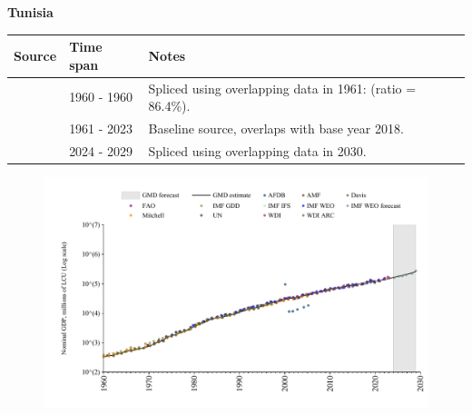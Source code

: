 \documentclass[12pt,a4paper,landscape]{article}
\begin{document}
\begin{adjustbox}{max totalsize={\paperwidth}{\paperheight},center}
\begin{minipage}[t][\textheight][t]{\textwidth}
\vspace*{0.5cm}
{}
\begin{center}
{\Large\bfseries Tunisia}
\end{center}
\vspace{0.5cm}
\begin{table}[H]
\centering
\small
\begin{tabular}{|l|l|l|}
\hline
\textbf{Source} & \textbf{Time span} & \textbf{Notes} \\
\hline
\rowcolor{white}\cite{IMF_GDD}& 1960 - 1960 &Spliced using overlapping data in 1961: (ratio = 86.4\%).\\
\rowcolor{lightgray}\cite{WDI}& 1961 - 2023 &Baseline source, overlaps with base year 2018.\\
\rowcolor{white}\cite{IMF_WEO_forecast}& 2024 - 2029 &Spliced using overlapping data in 2030.\\
\hline
\end{tabular}
\end{table}
\begin{figure}[H]
\centering
\includegraphics[width=\textwidth,height=0.6\textheight,keepaspectratio]{graphs/TUN_nGDP.pdf}
\end{figure}
\end{minipage}
\end{adjustbox}
\end{document}
